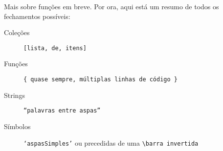 Mais sobre funções em breve. Por ora, aqui está um resumo de todos os fechamentos possíveis:

\begin{description}
\item[Coleções] \texttt{[lista, de, itens]}
\item[Funções] \texttt{\{ quase sempre, múltiplas linhas de código \}}
\item[Strings] \texttt{“palavras entre aspas”}
\item[Símbolos] \texttt{‘aspasSimples’} ou precedidas de uma \texttt{\textbackslash barra invertida}
\end{description}
